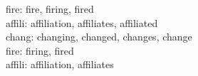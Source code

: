 


\noindent
fire: fire, firing, fired\\
affili: affiliation, affiliates, affiliated\\
chang: changing, changed, changes, change\\



\noindent
fire: firing, fired\\
affili: affiliation, affiliates\\
